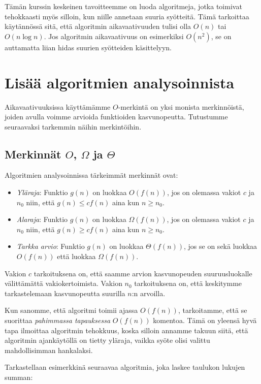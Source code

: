 Tämän kurssin keskeinen tavoitteemme on luoda algoritmeja,
jotka toimivat tehokkaasti myös silloin, kun niille annetaan suuria syötteitä.
Tämä tarkoittaa käytännössä sitä, että algoritmin aikavaativuuden tulisi
olla $O(n)$ tai $O(n \log n)$.
Jos algoritmin aikavaativuus on esimerkiksi $O(n^2)$,
se on auttamatta liian hidas suurien syötteiden käsittelyyn.

\section{Lisää algoritmien analysoinnista}

Aikavaativuuksissa käyttämämme $O$-merkintä on yksi monista merkinnöistä,
joiden avulla voimme arvioida funktioiden kasvunopeutta.
Tutustumme seuraavaksi tarkemmin näihin merkintöihin.

\subsection{Merkinnät $O$, $\Omega$ ja $\Theta$}

Algoritmien analysoinnissa tärkeimmät merkinnät ovat:

\begin{itemize}
\item \emph{Yläraja}: Funktio $g(n)$ on luokkaa $O(f(n))$, jos on olemassa vakiot $c$ ja $n_0$
niin, että $g(n) \le c f(n)$ aina kun $n \ge n_0$.
\item \emph{Alaraja}: Funktio $g(n)$ on luokkaa $\Omega(f(n))$, jos on olemassa vakiot $c$ ja $n_0$
niin, että $g(n) \ge c f(n)$ aina kun $n \ge n_0$.
\item \emph{Tarkka arvio}: Funktio $g(n)$ on luokkaa $\Theta(f(n))$, jos se on sekä luokkaa $O(f(n))$
että luokkaa $\Omega(f(n))$.
\end{itemize}

Vakion $c$ tarkoituksena on, että saamme arvion kasvunopeuden suuruusluokalle välittämättä
vakiokertoimista. Vakion $n_0$ tarkoituksena on, että keskitymme tarkastelemaan
kasvunopeutta suurilla $n$:n arvoilla.

Kun sanomme, että algoritmi toimii ajassa $O(f(n))$, tarkoitamme, että se suorittaa
\emph{pahimmassa tapauksessa} $O(f(n))$ komentoa.
Tämä on yleensä hyvä tapa ilmoittaa algoritmin tehokkuus,
koska silloin annamme takuun siitä, että algoritmin ajankäytöllä on tietty yläraja,
vaikka syöte olisi valittu mahdollisimman hankalaksi.

Tarkastellaan esimerkkinä seuraavaa algoritmia, joka laskee
taulukon lukujen summan:

